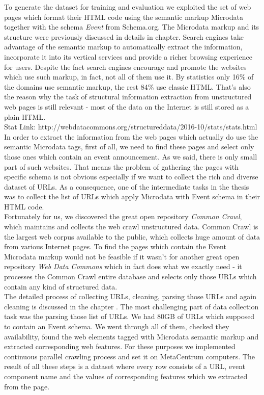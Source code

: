 To generate the dataset for training and evaluation we exploited the set of web pages which format their HTML code using the semantic markup Microdata together with the schema \textit{Event} from Schema.org. The Microdata markup and its structure were previously discussed in details in  chapter. Search engines take advantage of the semantic markup to automatically extract the information, incorporate it into its vertical services and provide a richer browsing experience for users. Despite the fact search engines encourage and promote the websites which use such markup, in fact, not all of them use it. By statistics only 16\% of the domains use semantic markup, the rest 84\% use classic HTML. That's also the reason why the task of structural information extraction from unstructured web pages is still relevant - most of the data on the Internet is still stored as a plain HTML.\\ 

Stat Link: http://webdatacommons.org/structureddata/2016-10/stats/stats.html  \\

In order to extract the information from the web pages which actually do use the semantic Microdata tags, first of all, we need to find these pages and select only those ones which contain an event announcement. As we said, there is only small part of such websites. That means the problem of gathering the pages with specific schema is not obvious especially if we want to collect the rich and diverse dataset of URLs. As a consequence, one of the intermediate tasks in the thesis was to collect the list of URLs which apply Microdata with Event schema in their HTML code. \\

Fortunately for us, we discovered the great open repository \textit{Common Crawl}, which maintains and collects the web crawl unstructured data. Common Crawl is the largest web corpus available to the public, which collects huge amount of data from various Internet pages. To find the pages which contain the Event Microdata markup would not be feasible if it wasn't for another great open repository \textit{Web Data Commons} which in fact does what we exactly need - it processes the Common Crawl entire database and selects only those URLs which contain any kind of structured data.\\

The detailed process of collecting URLs, cleaning, parsing those URLs and again cleaning is discussed in the chapter . The most challenging part of data collection task was the parsing those list of URLs. We had 80GB of URLs which supposed to contain an Event schema. We went through all of them, checked they availability, found the web elements tagged with Microdata semantic markup and extracted corresponding web features. For these purposes we implemented continuous parallel crawling process and set it on MetaCentrum computers. The result of all these steps is a dataset where every row consists of a URL, event component name and the values of corresponding features which we extracted from the page.\\ 

